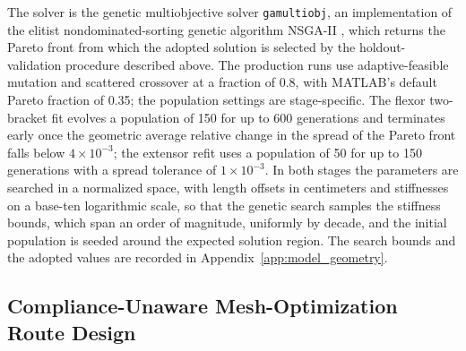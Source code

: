 The solver is the genetic multiobjective solver \texttt{gamultiobj}, an implementation of the elitist nondominated-sorting genetic algorithm NSGA-II \citep{deb_nsga2_2002, mathworks_optimization_2025}, which returns the Pareto front from which the adopted solution is selected by the holdout-validation procedure described above. The production runs use adaptive-feasible mutation and scattered crossover at a fraction of 0.8, with MATLAB's default Pareto fraction of 0.35; the population settings are stage-specific. The flexor two-bracket fit evolves a population of 150 for up to 600 generations and terminates early once the geometric average relative change in the spread of the Pareto front falls below $4\times10^{-3}$; the extensor refit uses a population of 50 for up to 150 generations with a spread tolerance of $1\times10^{-3}$. In both stages the parameters are searched in a normalized space, with length offsets in centimeters and stiffnesses on a base-ten logarithmic scale, so that the genetic search samples the stiffness bounds, which span an order of magnitude, uniformly by decade, and the initial population is seeded around the expected solution region. The search bounds and the adopted values are recorded in Appendix~\ref{app:model_geometry}.

\subsection{Compliance-Unaware Mesh-Optimization Route Design}\label{sec:mesh_opt}\label{sec:optimization}

